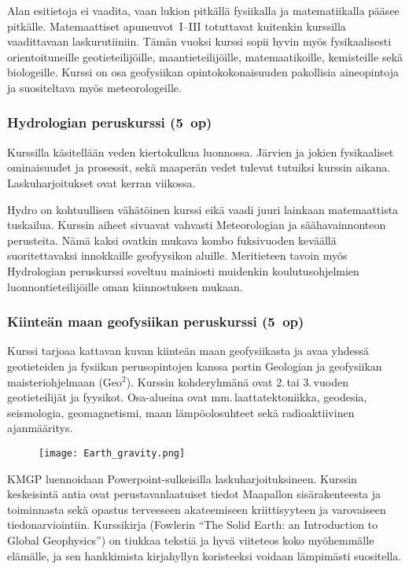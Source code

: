 \documentclass[../ala_hataile.tex]{subfiles}
\begin{document}
Alan esitietoja ei vaadita, vaan lukion
pitkällä fysiikalla ja matematiikalla pääsee
pitkälle. Matemaattiset apuneuvot~I--III
totuttavat kuitenkin kurssilla vaadittavaan
laskurutiiniin. Tämän vuoksi kurssi sopii
hyvin myös fysikaalisesti orientoituneille geotieteilijöille,
maantieteilijöille, matemaatikoille, kemisteille
sekä biologeille. Kurssi on osa geofysiikan opintokokonaisuuden
pakollisia aineopintoja ja suositeltava myös meteorologeille.

\subsubsection*{Hydrologian peruskurssi (5~op)}
Kurssilla käsitellään veden kiertokulkua
luonnossa. Järvien ja jokien fysikaaliset
ominaisuudet ja prosessit, sekä maaperän
vedet tulevat tutuiksi kurssin aikana. Laskuharjoitukset
ovat kerran viikossa.

Hydro on kohtuullisen vähätöinen kurssi
eikä vaadi juuri lainkaan matemaattista
tuskailua. Kurssin aiheet sivuavat vahvasti Meteorologian
ja säähavainnonteon perusteita. Nämä
kaksi ovatkin mukava kombo fuksivuoden
keväällä suoritettavaksi innokkaille geofyysikon
aluille. Meritieteen tavoin myös
Hydrologian peruskurssi soveltuu mainiosti
muidenkin koulutusohjelmien luonnontieteilijöille
oman kiinnostuksen mukaan.

\subsubsection*{Kiinteän maan geofysiikan peruskurssi (5~op)}
Kurssi tarjoaa kattavan kuvan kiinteän
maan geofysiikasta ja avaa yhdessä geotieteiden ja fysiikan
perusopintojen kanssa portin Geologian ja geofysiikan maisteriohjelmaan (Geo$^2$). Kurssin kohderyhmänä
ovat 2.\,tai 3.\,vuoden
geotieteilijät ja fyysikot.
Osa-alueina ovat mm.\,laatta\-tektoniikka,
geodesia, seismologia, geo\-magnetismi,
maan lämpö\-olo\-suhteet sekä radio\-aktiivinen
ajan\-määritys.
\begin{figure}[b!]
	\centering
	\texttt{[image: Earth\_gravity.png]}
\end{figure}

KMGP luennoidaan Powerpoint-sulkeisilla
lasku\-harjoituksineen. Kurssin keskeisintä antia ovat perustavan\-laatuiset tiedot Maapallon sisä\-rakenteesta ja toiminnasta sekä opastus terveeseen
akateemiseen kriittisyyteen ja varovaiseen tiedon\-arviointiin. Kurssikirja (Fowlerin
``The Solid Earth: an Introduction to Global
Geophysics'') on tiukkaa tekstiä ja hyvä
viite\-teos koko myöhemmälle elämälle, ja
sen hankkimista kirja\-hyllyn koristeeksi
voidaan lämpimästi suositella.
\end{document}
